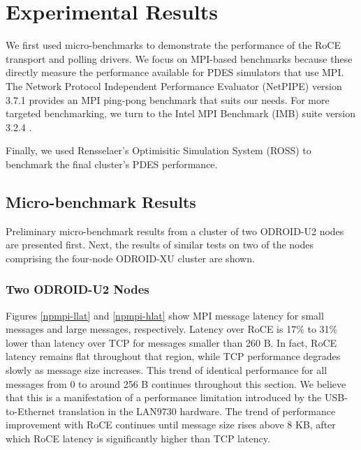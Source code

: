 \documentclass[11pt]{book}
\begin{document}
\chapter{Experimental Results}\label{results}


We first used micro-benchmarks to demonstrate the performance of the RoCE transport and
polling drivers.  We focus on MPI-based benchmarks because these directly measure the
performance available for PDES simulators that use MPI.  The Network Protocol Independent
Performance Evaluator (NetPIPE) \cite{NetPIPE} version 3.7.1 provides an MPI ping-pong
benchmark that suits our needs.  For more targeted benchmarking, we turn to the Intel MPI
Benchmark (IMB) suite version 3.2.4 \cite{}.

Finally, we used Rensselaer's Optimisitic Simulation System (ROSS) to benchmark
the final cluster's PDES performance.

\section{Micro-benchmark Results}

Preliminary micro-benchmark results from a cluster of two ODROID-U2 nodes are presented
first.  Next, the results of similar tests on two of the nodes comprising the four-node
ODROID-XU cluster are shown.

\subsection{Two ODROID-U2 Nodes}

Figures \ref{npmpi-llat} and \ref{npmpi-hlat} show MPI message latency for small messages
and large messages, respectively.  Latency over RoCE is 17\% to 31\% lower than latency
over TCP for messages smaller than 260 B.  In fact, RoCE latency remains flat throughout
that region, while TCP performance degrades slowly as message size increases.  This trend
of identical performance for all messages from 0 to around 256 B continues throughout this
section.  We believe that this is a manifestation of a performance limitation introduced
by the USB-to-Ethernet translation in the LAN9730 hardware.  The trend of performance
improvement with RoCE continues until message size rises above 8 KB, after which RoCE
latency is significantly higher than TCP latency.
\end{document}
